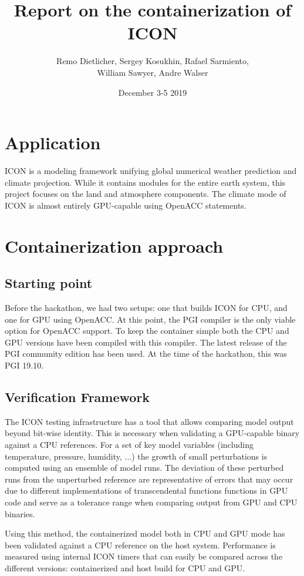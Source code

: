 \documentclass{article}
\title{Report on the containerization of ICON}
\author{Remo Dietlicher, Sergey Kosukhin, Rafael Sarmiento, \\ William Sawyer, Andre Walser}
\date{December 3-5 2019}
\begin{document}
\maketitle

\section{Application}
ICON is a modeling framework unifying global numerical weather prediction and climate projection. While it contains modules for the entire earth system, this project focuses on the land and atmosphere components. The climate mode of ICON is almost entirely GPU-capable using OpenACC statements.

\section{Containerization approach}
\subsection{Starting point}
Before the hackathon, we had two setups: one that builds ICON for CPU, and one for GPU using OpenACC. At this point, the PGI compiler is the only viable option for OpenACC support. To keep the container simple both the CPU and GPU versions have been compiled with this compiler. The latest release of the PGI community edition has been used. At the time of the hackathon, this was PGI 19.10.

\subsection{Verification Framework}
The ICON testing infrastructure has a tool that allows comparing model output beyond bit-wise identity. This is necessary when validating a GPU-capable binary against a CPU references. For a set of key model variables (including temperature, pressure, humidity, ...) the growth of small perturbations is computed using an ensemble of model runs. The deviation of these perturbed runs from the unperturbed reference are representative of errors that may occur due to different implementations of transcendental functions functions in GPU code and serve as a tolerance range when comparing output from GPU and CPU binaries.

Using this method, the containerized model both in CPU and GPU mode has been validated against a CPU reference on the host system. Performance is measured using internal ICON timers that can easily be compared across the different versions: containerized and host build for CPU and GPU.
\end{document}
